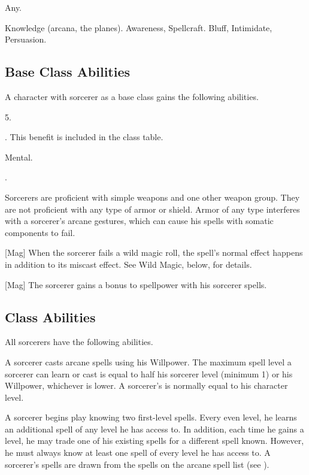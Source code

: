      Any.

     Knowledge (arcana, the planes).
     Awareness, Spellcraft.
     Bluff, Intimidate, Persuasion.

    \subsection{Base Class Abilities}
        A character with sorcerer as a base class gains the following abilities.

         5.

         . This benefit is included in the class table.

          Mental.

         .

        Sorcerers are proficient with simple weapons  and one other weapon group.
        They are not proficient with any type of armor or shield.
        Armor of any type interferes with a sorcerer's arcane gestures, which can cause his spells with somatic components to fail.

        [Mag]
        When the sorcerer fails a wild magic roll, the spell's normal effect happens in addition to its miscast effect.
        See Wild Magic, below, for details.

        [Mag]
        The sorcerer gains a  bonus to spellpower with his sorcerer spells.

    \subsection{Class Abilities}
        All sorcerers have the following abilities.

        A sorcerer casts arcane spells using his Willpower.
        The maximum spell level a sorcerer can learn or cast is equal to half his sorcerer level (minimum 1) or his Willpower, whichever is lower.
        A sorcerer's  is normally equal to his character level.

        A sorcerer begins play knowing two first-level spells.
        Every even level, he learns an additional spell of any level he has access to.
        In addition, each time he gains a level, he may trade one of his existing spells for a different spell known.
        However, he must always know at least one spell of every level he has access to.
        A sorcerer's spells are drawn from the spells on the arcane spell list (see ).

